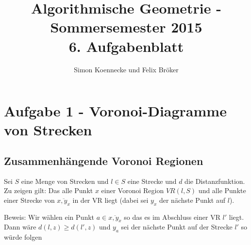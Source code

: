 \documentclass[a4paper]{article}
\begin{document}
\title{Algorithmische Geometrie - Sommersemester 2015\\
       6. Aufgabenblatt }
\author{Simon Koennecke und Felix Bröker}
\date{}
\maketitle

\section*{Aufgabe 1 - Voronoi-Diagramme von Strecken}

\begin{figure} [!htb] 
\end{figure} 



\subsection*{Zusammenhängende Voronoi Regionen}

Sei $S$ eine Menge von Strecken und $l \in S$ eine Strecke und $d$ die Distanzfunktion.
Zu zeigen gilt: Das alle Punkt $x$ einer Voronoi Region  $VR(l, S)$ und alle Punkte einer Strecke von $\overline{x, y_x}$ in der VR liegt (dabei sei $y_x$ der nächste Punkt auf $l$).

Beweis: Wir wählen ein Punkt $a \in \overline{x, y_x}$ so das es im Abschluss einer VR $l'$ liegt. Dann wäre $d(l, z) \geq d(l', z)$ und $y_a$ sei der nächste Punkt auf der Strecke $l'$ so würde folgen
\end{document}
